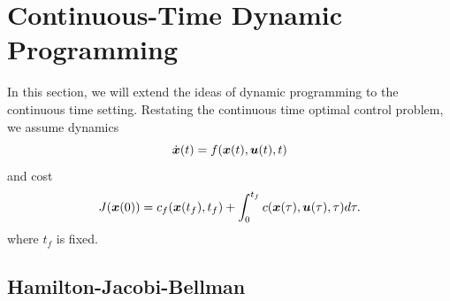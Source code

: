 


\section{Continuous-Time Dynamic Programming}


In this section, we will extend the ideas of dynamic programming to the continuous time setting. Restating the continuous time optimal control problem, we assume dynamics
\begin{equation}
    \dot{\bm{x}}(t) = f(\bm{x}(t),\bm{u}(t),t)
\end{equation}
and cost
\begin{equation}
    J(\bm{x}(0)) = c_f(\bm{x}(t_f),t_f) + \int_0^{t_f} c(\bm{x}(\tau),\bm{u}(\tau),\tau) d\tau.
\end{equation}
where $t_f$ is fixed. 


\subsection{Hamilton-Jacobi-Bellman}

